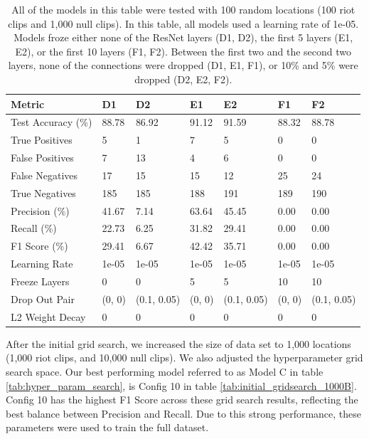 \begin{table}
\centering
\begin{tabular}{|l|l|l|l|l|l|l|}

\hline
Metric & D1 & D2 & E1 & E2 & F1 & F2 \\ \hline
\hline
Test Accuracy (\%) & 88.78 & 86.92 & 91.12 & 91.59 & 88.32 & 88.78 \\ \hline
True Positives & 5 & 1 & 7 & 5 & 0 & 0 \\ \hline
False Positives & 7 & 13 & 4 & 6 & 0 & 0 \\ \hline
False Negatives & 17 & 15 & 15 & 12 & 25 & 24 \\ \hline
True Negatives & 185 & 185 & 188 & 191 & 189 & 190 \\ \hline
\hline
Precision (\%) & 41.67 & 7.14 & 63.64 & 45.45 & 0.00 & 0.00 \\ \hline
Recall (\%) & 22.73 & 6.25 & 31.82 & 29.41 & 0.00 & 0.00 \\ \hline
F1 Score (\%) & 29.41 & 6.67 & 42.42 & 35.71 & 0.00 & 0.00 \\ \hline
\hline
Learning Rate & 1e-05 & 1e-05 & 1e-05 & 1e-05 & 1e-05 & 1e-05 \\ \hline
Freeze Layers & 0 & 0 & 5 & 5 & 10 & 10 \\ \hline
Drop Out Pair & (0, 0) & (0.1, 0.05) & (0, 0) & (0.1, 0.05) & (0, 0) & (0.1, 0.05) \\ \hline
L2 Weight Decay & 0 & 0 & 0 & 0 & 0 & 0 \\ \hline
\hline
\end{tabular}
\caption{All of the models in this table were tested with 100 random locations (100 riot clips and 1,000 null clips). In this table, all models used a learning rate of 1e-05. Models froze either none of the ResNet layers (D1, D2), the first 5 layers (E1, E2), or the first 10 layers (F1, F2). Between the first two and the second two layers, none of the connections were dropped (D1, E1, F1), or 10\% and 5\% were dropped (D2, E2, F2).}
\label{tab:initial_gridsearch_100B}
\end{table}

After the initial grid search, we increased the size of data set to 1,000 locations (1,000 riot clips, and 10,000 null clips).  We also adjusted the hyperparameter grid search space.  Our best performing model referred to as Model C in table \ref{tab:hyper_param_search}, is Config 10 in table \ref{tab:initial_gridsearch_1000B}.  Config 10 has the highest F1 Score across these grid search results, reflecting the best balance between Precision and Recall.  Due to this strong performance, these parameters were used to train the full dataset.


